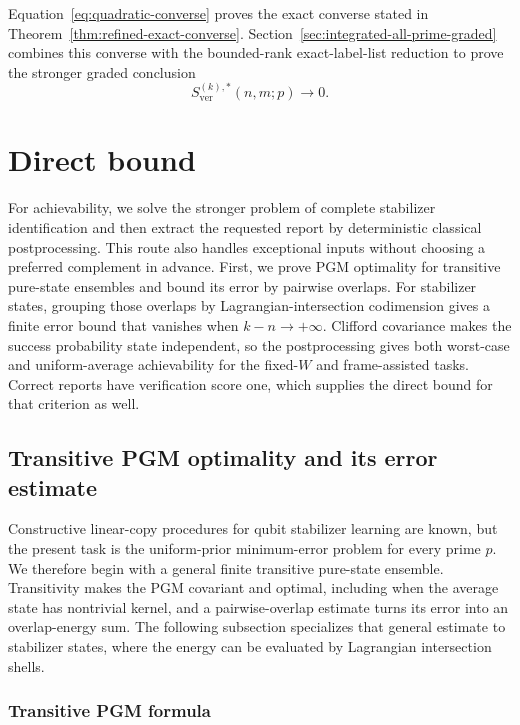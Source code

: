 \documentclass[11pt]{article}
\newcommand{\1}{\mathbf 1}
\theoremstyle{plain}
\theoremstyle{definition}
\theoremstyle{remark}
\begin{document}
Equation~\eqref{eq:quadratic-converse} proves the exact converse stated
in Theorem~\ref{thm:refined-exact-converse}.  Section~\ref{sec:integrated-all-prime-graded}
combines this converse with the bounded-rank exact-label-list reduction to
prove the stronger graded conclusion
\begin{equation}
 S_{\mathrm{ver}}^{(k),*}(n,m;p)\longrightarrow0.
 \label{eq:graded-conclusion-forward-reference}
\end{equation}

\section{Direct bound}
\label{sec:fourier-achievability}
For achievability, we solve the stronger problem of complete stabilizer
identification and then extract the requested report by deterministic
classical postprocessing.  This route also handles exceptional inputs without
choosing a preferred complement in advance.  First, we prove PGM optimality
for transitive pure-state ensembles and bound its error by pairwise overlaps.
For stabilizer states, grouping those overlaps by Lagrangian-intersection
codimension gives a finite error bound that vanishes when $k-n\to+\infty$.
Clifford covariance makes the success probability state independent, so the
postprocessing gives both worst-case and uniform-average achievability for
the fixed-$W$ and frame-assisted tasks.  Correct reports have verification
score one, which supplies the direct bound for that criterion as well.

\subsection{Transitive PGM optimality and its error estimate}
\label{subsec:unrestricted-stabilizer-direct}
Constructive linear-copy procedures for qubit stabilizer learning are known,
but the present task is the uniform-prior minimum-error problem for every
prime $p$.  We therefore begin with a general finite transitive pure-state
ensemble.  Transitivity makes the PGM covariant and optimal, including when
the average state has nontrivial kernel, and a pairwise-overlap estimate turns
its error into an overlap-energy sum.  The following subsection specializes
that general estimate to stabilizer states, where the energy can be evaluated
by Lagrangian intersection shells.

\subsubsection{Transitive PGM formula}
\label{subsubsec:transitive-pgm-formula}
\end{document}
